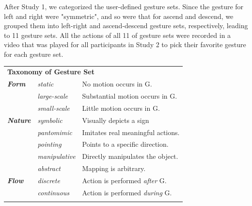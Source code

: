 \documentclass{sigchi}
\newcommand\tabhead[1]{\small\textbf{#1}}
\begin{document}
After Study 1, we categorized the user-defined gesture sets. Since the gesture for left and right were "symmetric", and so were that for ascend and descend, we grouped them into left-right and ascend-descend gesture sets, respectively, leading to 11 gesture sets. All the actions of all 11 of gesture sets were recorded in a video that was played for all participants in Study 2 to pick their favorite gesture for each gesture set.

\begin{table}
  \centering
  \begin{adjustwidth}{-0.4cm}{}
  \begin{tabular}{|l|l|l|}
    \hline
    \multicolumn{3}{|p{1.06\columnwidth}|}{\centering\tabhead{\textbf{Taxonomy of Gesture Set}}}\\
    \Xhline{4\arrayrulewidth}
    \textit{\textbf {Form}} &{\it static}& No motion occurs in G.\\ \cline{2-3}
    &{\it large-scale}& Substantial motion occurs in G. \\ \cline{2-3}
    &{\it small-scale}& Little motion occurs in G.\\
    \Xhline{4\arrayrulewidth}
    \textit{\textbf {Nature}} & {\it symbolic} &Visually depicts a sign \\ \cline{2-3}
    &{\it pantomimic}&Imitates real meaningful actions.\\ \cline{2-3}
    &{\it pointing}&Points to a specific direction.\\ \cline{2-3}
    &{\it manipulative}&Directly manipulates the object.\\ \cline{2-3}
    &{\it abstract}&Mapping is arbitrary.\\
    \Xhline{4\arrayrulewidth}
    \textit{\textbf {Flow}} & {\it discrete}&Action is performed {\it after} G.\\ \cline{2-3}
    &{\it continuous}&Action is performed {\it during} G.\\ 
    \Xhline{4\arrayrulewidth}

\end{tabular}
\end{adjustwidth}
\end{table}
\end{document}
